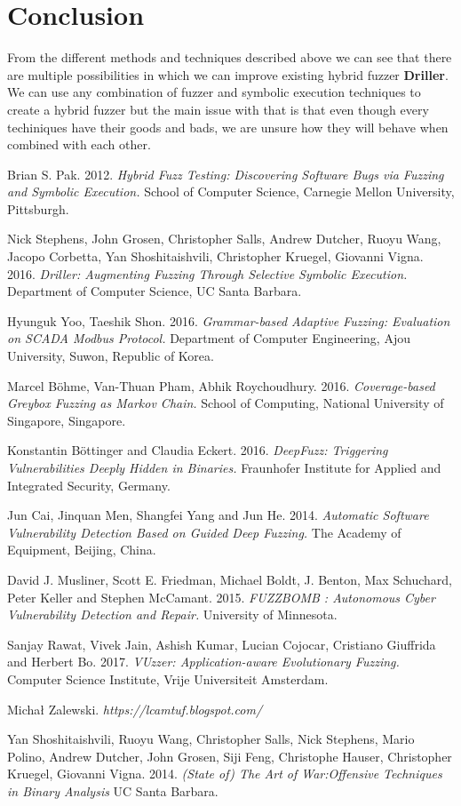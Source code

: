 \documentclass[a4paper, 11pt]{article}
\begin{document}
\section*{Conclusion}
From the different methods and techniques described above we can see that there are multiple possibilities in which we can improve existing hybrid fuzzer \textbf{Driller}.  We can use any combination of fuzzer and symbolic execution techniques to create a hybrid fuzzer but the main issue with that is that even though every techiniques have their goods and bads, we are unsure how they will behave when combined with each other.  
\begin{thebibliography}{15} 
Brian S. Pak. 2012. \emph{Hybrid Fuzz Testing: Discovering Software Bugs via Fuzzing and Symbolic Execution.} School of Computer Science, Carnegie Mellon University, Pittsburgh.

Nick Stephens, John Grosen, Christopher Salls, Andrew Dutcher, Ruoyu Wang, Jacopo Corbetta, Yan Shoshitaishvili, Christopher Kruegel, Giovanni Vigna. 2016. \emph{Driller: Augmenting Fuzzing Through Selective Symbolic Execution.}  Department of Computer Science, UC Santa Barbara.

Hyunguk Yoo, Taeshik Shon. 2016. \emph{Grammar-based Adaptive Fuzzing: Evaluation on SCADA Modbus Protocol.} Department of Computer Engineering, Ajou University, Suwon, Republic of Korea.

Marcel Böhme, Van-Thuan Pham, Abhik Roychoudhury. 2016. \emph{Coverage-based Greybox Fuzzing as Markov Chain.} School of Computing, National University of Singapore, Singapore.

Konstantin Böttinger and Claudia Eckert. 2016. \emph{DeepFuzz: Triggering Vulnerabilities Deeply Hidden in Binaries.} Fraunhofer Institute for Applied and Integrated Security, Germany.

Jun Cai, Jinquan Men, Shangfei Yang and Jun He. 2014. \emph{Automatic Software Vulnerability Detection Based on Guided Deep Fuzzing.} The Academy of Equipment, Beijing, China.

David J. Musliner, Scott E. Friedman, Michael Boldt, J. Benton, Max Schuchard, Peter Keller and Stephen McCamant. 2015. \emph{FUZZBOMB : Autonomous Cyber Vulnerability Detection and Repair.} University of Minnesota.

Sanjay Rawat, Vivek Jain, Ashish Kumar, Lucian Cojocar, Cristiano Giuffrida and Herbert Bo. 2017. \emph{VUzzer: Application-aware Evolutionary Fuzzing.} Computer Science Institute, Vrije Universiteit Amsterdam.

Michał Zalewski. \emph{https://lcamtuf.blogspot.com/}

Yan Shoshitaishvili, Ruoyu Wang, Christopher Salls, Nick Stephens, Mario Polino, Andrew Dutcher, John Grosen, Siji Feng, Christophe Hauser, Christopher Kruegel, Giovanni Vigna. 2014. \emph{(State of) The Art of War:Offensive Techniques in Binary Analysis} UC Santa Barbara.

\end{thebibliography}
\end{document}
